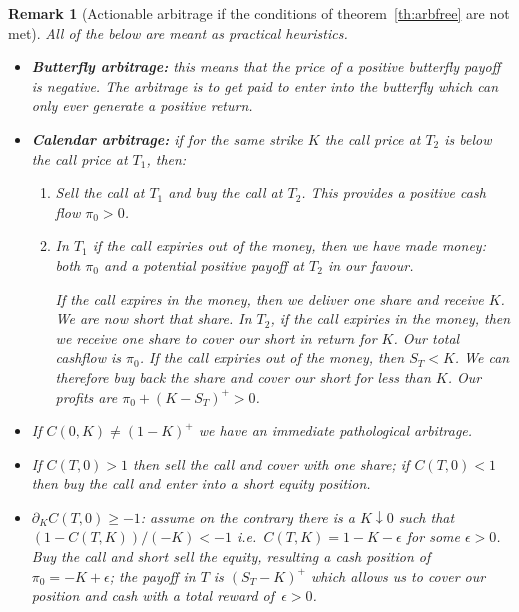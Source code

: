 \documentclass[11pt,a4paper]{article}
\newtheorem{remark}[definition]{Remark}
\begin{document}
\begin{remark}[Actionable arbitrage if the conditions of theorem~\ref{th:arbfree} are not met]
All of the below are meant as practical heuristics.
\begin{itemize}
    \item \textbf{Butterfly arbitrage:} this means that the price of a positive
    butterfly payoff is negative. The arbitrage is to get paid to enter into 
    the butterfly which can only ever generate a positive return.

    \item \textbf{Calendar arbitrage:} if for the same strike $K$ 
    the call price at $T_2$ is below the call price
    at $T_1$, then:
    \begin{enumerate}
        \item 
            Sell the call at $T_1$ and buy the call at $T_2$. This provides
            a positive cash flow $\pi_0>0$.
        \item 
            In $T_1$ if the call expiries out of the money, then we have made money: both
            $\pi_0$ and a potential positive payoff at $T_2$ in our favour.

            If the call expires in the money, then we deliver one share
            and receive $K$. We are now short that share.
            In $T_2$, if the call expiries in the money, then we receive one share
            to cover our short in return for $K$. Our total cashflow is $\pi_0$.
            If the call expiries out of the money, then $S_T<K$. We can therefore
            buy back the share and cover our short for less than $K$.
            Our profits are $\pi_0+(K-S_T)^+>0$.
    \end{enumerate}
    \item If $C(0,K) \not= (1-K)^+$ we have an immediate pathological arbitrage.
    \item If $C(T,0)>1$ then sell the call and cover with one share; if $C(T,0)<1$
    then buy the call and enter into a short equity position.

    \item $\partial_K C(T,0)\geq -1$: assume on the contrary there is a $K\downarrow 0$
    such that $(1-C(T,K))/(-K) < -1$ i.e.~$C(T,K) = 1-K - \epsilon$ for some $\epsilon>0$.
          Buy the call and short sell the equity, resulting a cash position of $\pi_0=-K+\epsilon$;
          the payoff in $T$ is $(S_T-K)^+$ which allows us to cover our position and cash
          with a total reward of~$\epsilon>0$.


\end{itemize}
\end{remark}
\end{document}
